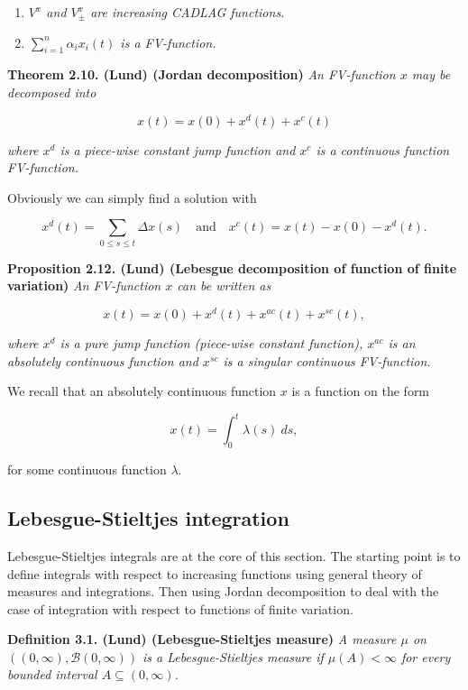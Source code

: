 \documentclass[a4paper,10pt,openany]{book}
\providecommand{\tightlist}{%
 \setlength{\itemsep}{0pt}\setlength{\parskip}{0pt}}
\begin{document}
\begin{enumerate}
\def\labelenumi{\roman{enumi})}
\tightlist
\item
  \emph{\(V^x\) and \(V_\pm^x\) are increasing CADLAG functions.}
\item
  \emph{\(\sum_{i=1}^n \alpha_ix_i(t)\) is a FV-function.}
\end{enumerate}

\textbf{Theorem 2.10. (Lund) (Jordan decomposition)} \emph{An FV-function \(x\) may be decomposed into}

\[
x(t)=x(0)+x^d(t)+x^c(t)
\]

\emph{where \(x^d\) is a piece-wise constant jump function and \(x^c\) is a continuous function FV-function.}

Obviously we can simply find a solution with

\[
x^d(t)=\sum_{0\le s\le t}\Delta x(s)\quad \text{and}\quad x^c(t)=x(t)-x(0)-x^d(t).
\]

\textbf{Proposition 2.12. (Lund) (Lebesgue decomposition of function of finite variation)} \emph{An FV-function \(x\) can be written as}

\[
x(t)=x(0)+x^d(t)+x^{ac}(t)+x^{sc}(t),
\]

\emph{where \(x^d\) is a pure jump function (piece-wise constant function), \(x^{ac}\) is an absolutely continuous function and \(x^{sc}\) is a singular continuous FV-function.}

We recall that an absolutely continuous function \(x\) is a function on the form

\[
x(t)=\int_0^t\lambda(s)\ ds,
\]

for some continuous function \(\lambda\).

\hypertarget{lebesgue-stieltjes-integration}{%
\subsection{Lebesgue-Stieltjes integration}\label{lebesgue-stieltjes-integration}}

Lebesgue-Stieltjes integrals are at the core of this section. The starting point is to define integrals with respect to increasing functions using general theory of measures and integrations. Then using Jordan decomposition to deal with the case of integration with respect to functions of finite variation.

\textbf{Definition 3.1. (Lund) (Lebesgue-Stieltjes measure)} \emph{A measure \(\mu\) on \(((0,\infty),\mathcal B(0,\infty))\) is a Lebesgue-Stieltjes measure if \(\mu(A)<\infty\) for every bounded interval \(A\subseteq (0,\infty)\).}
\end{document}
